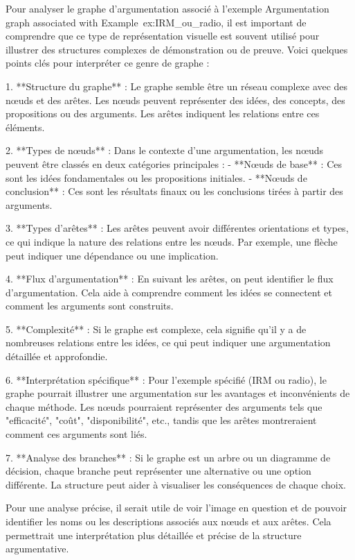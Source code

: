 Pour analyser le graphe d'argumentation associé à l'exemple Argumentation graph associated with Example~ex:IRM_ou_radio, il est important de comprendre que ce type de représentation visuelle est souvent utilisé pour illustrer des structures complexes de démonstration ou de preuve. Voici quelques points clés pour interpréter ce genre de graphe :

1. **Structure du graphe** : Le graphe semble être un réseau complexe avec des nœuds et des arêtes. Les nœuds peuvent représenter des idées, des concepts, des propositions ou des arguments. Les arêtes indiquent les relations entre ces éléments.

2. **Types de nœuds** : Dans le contexte d'une argumentation, les nœuds peuvent être classés en deux catégories principales :
   - **Nœuds de base** : Ces sont les idées fondamentales ou les propositions initiales.
   - **Nœuds de conclusion** : Ces sont les résultats finaux ou les conclusions tirées à partir des arguments.

3. **Types d'arêtes** : Les arêtes peuvent avoir différentes orientations et types, ce qui indique la nature des relations entre les nœuds. Par exemple, une flèche peut indiquer une dépendance ou une implication.

4. **Flux d'argumentation** : En suivant les arêtes, on peut identifier le flux d'argumentation. Cela aide à comprendre comment les idées se connectent et comment les arguments sont construits.

5. **Complexité** : Si le graphe est complexe, cela signifie qu'il y a de nombreuses relations entre les idées, ce qui peut indiquer une argumentation détaillée et approfondie.

6. **Interprétation spécifique** : Pour l'exemple spécifié (IRM ou radio), le graphe pourrait illustrer une argumentation sur les avantages et inconvénients de chaque méthode. Les nœuds pourraient représenter des arguments tels que "efficacité", "coût", "disponibilité", etc., tandis que les arêtes montreraient comment ces arguments sont liés.

7. **Analyse des branches** : Si le graphe est un arbre ou un diagramme de décision, chaque branche peut représenter une alternative ou une option différente. La structure peut aider à visualiser les conséquences de chaque choix.

Pour une analyse précise, il serait utile de voir l'image en question et de pouvoir identifier les noms ou les descriptions associés aux nœuds et aux arêtes. Cela permettrait une interprétation plus détaillée et précise de la structure argumentative.